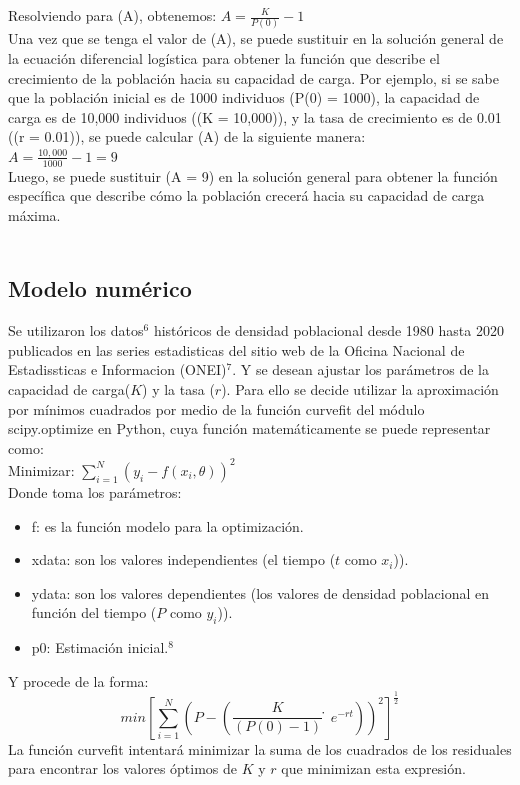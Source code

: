 \documentclass[a4paper,10pt,twocolumn]{article}
\begin{document}
Resolviendo para (A), obtenemos: $A = \frac{K}{P(0)} - 1$\\
Una vez que se tenga el valor de (A), se puede sustituir en la solución general de la ecuación diferencial 
logística para obtener la función que describe el crecimiento de la población hacia su capacidad de carga.
Por ejemplo, si se sabe que la población inicial es de 1000 individuos (P(0) = 1000), la capacidad de carga 
es de 10,000 individuos ((K = 10,000)), y la tasa de crecimiento es de 0.01 ((r = 0.01)), 
se puede calcular (A) de la siguiente manera:\\
$A = \frac{10,000}{1000} - 1 = 9$\\
Luego, se puede sustituir (A = 9) en la solución general para obtener la función específica que describe cómo la 
población crecerá hacia su capacidad de carga máxima.\\\\

	\subsection{Modelo numérico}\label{sub:num}
Se utilizaron los datos$^{6}$ históricos de densidad poblacional desde 1980 hasta 2020 publicados en las series estadisticas del sitio web de la Oficina Nacional de Estadissticas e Informacion (ONEI)$^{7}$. Y se desean ajustar los parámetros de la capacidad de carga($K$) y la tasa ($r$).
Para ello se decide utilizar la aproximación por mínimos cuadrados por medio de la función curvefit del módulo scipy.optimize en Python, cuya función matemáticamente se puede representar como:\\
Minimizar: $\sum_{i=1}^{N} (y_{i} - f(x_{i}, \theta))^2 $ \\
Donde toma los parámetros:
\begin{itemize}
	\item f: es la función modelo para la optimización.
	\item xdata: son los valores independientes (el tiempo ($t$ como $x_{i}$)).
	\item ydata: son los valores dependientes (los valores de densidad poblacional en función del tiempo ($P$ como $y_{i}$)).
	\item p0: Estimación inicial.$^{8}$
\end{itemize}
Y procede de la forma:\\ $$min[\sum_{i=1}^{N} (P - (\frac{K}{(P(0)-1)}̇e^{-rt}))^{2}]^{\frac{1}{2}}$$
La función curvefit intentará minimizar la suma de los cuadrados de los residuales para encontrar los valores óptimos de $K$ y $r$ que minimizan esta expresión. 
\end{document}
